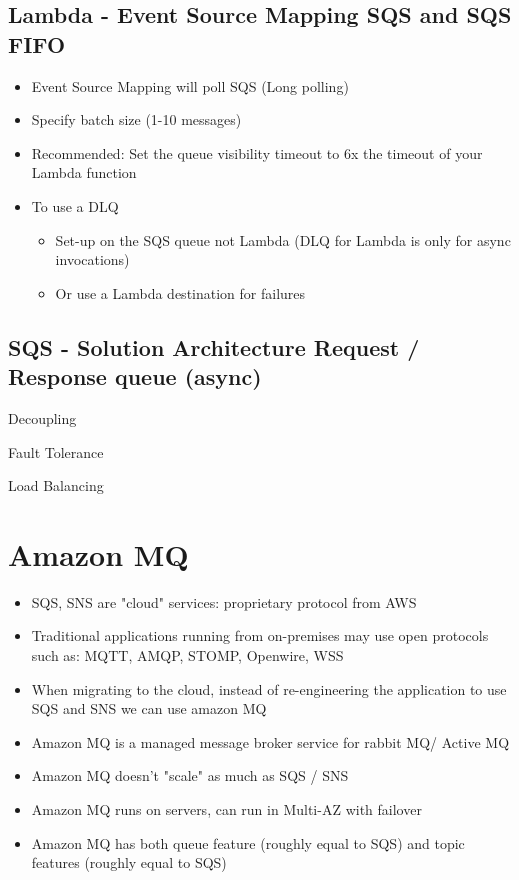 \subsection{Lambda - Event Source Mapping SQS and SQS FIFO}
\begin{itemize}
    \item Event Source Mapping will poll SQS (Long polling)
    \item Specify batch size (1-10 messages)
    \item Recommended: Set the queue visibility timeout to 6x the timeout of your Lambda function
    \item To use a DLQ
    \begin{itemize}
        \item Set-up on the SQS queue not Lambda (DLQ for Lambda is only for async invocations)
        \item Or use a Lambda destination for failures
    \end{itemize}
\end{itemize}

\subsection{SQS - Solution Architecture Request / Response queue (async)}
\item Decoupling
\item Fault Tolerance
\item Load Balancing


\section{Amazon MQ}

\begin{itemize}
    \item SQS, SNS are "cloud\itemnative" services: proprietary protocol from AWS
    \item Traditional applications running from on-premises may use open protocols such as: MQTT, AMQP, STOMP, Openwire, WSS
    \item When migrating to the cloud, instead of re-engineering the application to use SQS and SNS we can use amazon MQ
    \item Amazon MQ is a managed message broker service for rabbit MQ/ Active MQ
    \item Amazon MQ doesn't "scale" as much as SQS / SNS
    \item Amazon MQ runs on servers, can run in Multi-AZ with failover
    \item Amazon MQ has both queue feature (roughly equal to SQS) and topic features (roughly equal to SQS)
\end{itemize}

